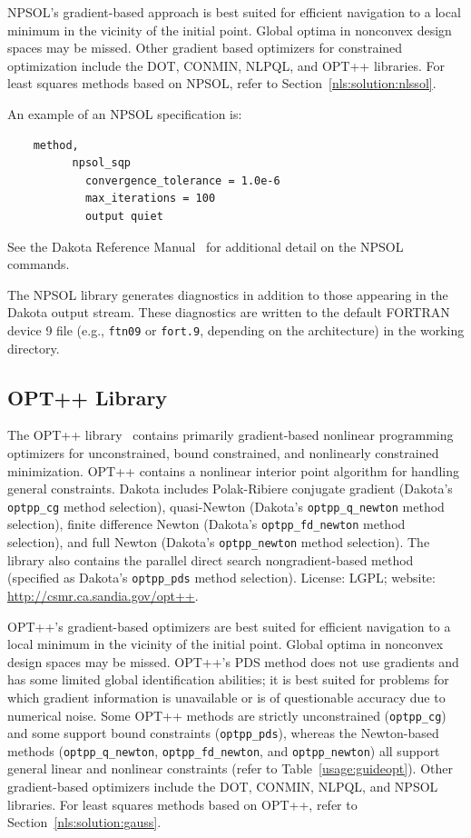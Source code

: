 NPSOL's gradient-based approach is best suited for efficient
navigation to a local minimum in the vicinity of the initial point.
Global optima in nonconvex design spaces may be missed. Other gradient
based optimizers for constrained optimization include the DOT, CONMIN,
NLPQL, and OPT++ libraries. For least squares methods based on NPSOL,
refer to Section~\ref{nls:solution:nlssol}.

An example of an NPSOL specification is:
\begin{small}
\begin{verbatim}
    method,
          npsol_sqp
            convergence_tolerance = 1.0e-6
            max_iterations = 100
            output quiet
\end{verbatim}
\end{small}

See the Dakota Reference Manual~\cite{RefMan} for additional detail on the
NPSOL commands. 

The NPSOL library generates diagnostics in addition to those appearing
in the Dakota output stream. These diagnostics are written to the
default FORTRAN device 9 file (e.g., \texttt{ftn09} or \texttt{fort.9},
depending on the architecture) in the working directory.

\subsection{OPT++ Library}\label{opt:software:optpp}

The OPT++ library~\cite{MeOlHoWi07} contains primarily gradient-based
nonlinear programming optimizers for unconstrained, bound constrained,
and nonlinearly constrained minimization. OPT++ contains a nonlinear
interior point algorithm for handling general constraints. Dakota
includes Polak-Ribiere conjugate gradient (Dakota's \texttt{optpp\_cg}
method selection), quasi-Newton (Dakota's \texttt{optpp\_q\_newton}
method selection), finite difference Newton (Dakota's
\texttt{optpp\_fd\_newton} method selection), and full Newton
(Dakota's \texttt{optpp\_newton} method selection). The library also
contains the parallel direct search nongradient-based
method~\cite{Den94b} (specified as Dakota's \texttt{optpp\_pds} method
selection). License: LGPL; website:
\url{http://csmr.ca.sandia.gov/opt++}.

OPT++'s gradient-based optimizers are best suited for efficient
navigation to a local minimum in the vicinity of the initial point.
Global optima in nonconvex design spaces may be missed. OPT++'s PDS
method does not use gradients and has some limited global
identification abilities; it is best suited for problems for which
gradient information is unavailable or is of questionable accuracy due
to numerical noise. Some OPT++ methods are strictly unconstrained
(\texttt{optpp\_cg}) and some support bound constraints
(\texttt{optpp\_pds}), whereas the Newton-based methods
(\texttt{optpp\_q\_newton}, \texttt{optpp\_fd\_newton}, and
\texttt{optpp\_newton}) all support general linear and nonlinear
constraints (refer to Table~\ref{usage:guideopt}). Other
gradient-based optimizers include the DOT, CONMIN, NLPQL, and NPSOL
libraries. For least squares methods based on OPT++, refer to
Section~\ref{nls:solution:gauss}.

